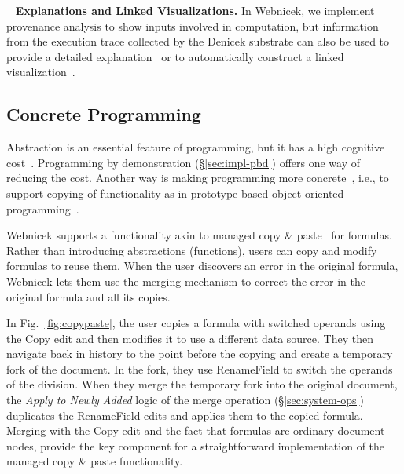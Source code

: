\documentclass[sigconf,anonymous,screen]{acmart}
\newcommand{\ident}[1]{{\sffamily #1}}
\newcommand{\note}[1]{\textcolor{red}{#1}}
\DeclareRobustCommand{\keyideabox}[3]{\begin{tcolorbox}[breakable,
  boxsep=5pt,left=0pt,right=0pt,top=0pt,bottom=0pt,width=\dimexpr\columnwidth\relax,
  colback=gray!20,colframe=gray!20,
  enlarge bottom by=0pt,enlarge top by=0pt,
  arc=0pt,outer arc=0pt]
\lettrine[lraise=0.3]{\LARGE #1}{~}
\small \textbf{#2.} #3
\end{tcolorbox}
}
\begin{document}
\keyideabox{\faBarChart}{Explanations and Linked Visualizations}{In Webnicek, we implement
provenance analysis to show inputs involved in computation, but information from the execution
trace collected by the Denicek substrate can also be used to provide a detailed
explanation~\cite{perera-2012-functional} or to automatically construct
a linked visualization~\cite{perera-2022-linked}.}


\subsection{Concrete Programming}
\label{sec:impl-copy}

Abstraction is an essential feature of programming, but it has a high cognitive
cost~\cite{blackwell-2002-attention}. Programming by demonstration (\S\ref{sec:impl-pbd})
offers one way of reducing the cost. Another way is making programming more
concrete~\cite{edwards-2004-example,smith-1975-pygmalion}, i.e., to support copying of functionality
as in prototype-based object-oriented programming~\cite{ungar-1987-self,randall-1995-self}.

Webnicek supports a functionality akin to managed copy \&
paste~\cite{edwards-2006-copypaste,edwards-2022-copypaste} for formulas. Rather than introducing
abstractions (functions), users can copy and modify formulas to reuse them. When the user
discovers an error in the original formula, Webnicek lets them use the merging mechanism to correct
the error in the original formula and all its copies.

In Fig.~\ref{fig:copypaste}, the user copies a formula with switched operands using
the \ident{Copy} edit and then modifies it to use a different data source. They then navigate back
in history to the point before the copying and create a temporary fork of the document. In the
fork, they use \ident{RenameField} to switch the operands of the division. When they merge the
temporary fork into the original document, the \emph{Apply to Newly Added} logic of the merge
operation (\S\ref{sec:system-ops}) duplicates the \ident{RenameField} edits and applies them
to the copied formula. Merging with the \ident{Copy} edit and the fact that formulas
are ordinary document nodes, provide the key component for a straightforward implementation of the
managed copy \& paste functionality.

\end{document}
